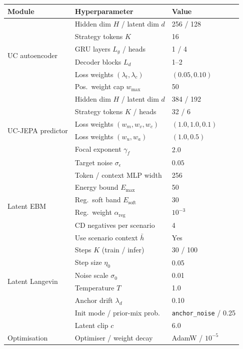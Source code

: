 \documentclass{article}
\begin{document}
\begin{table}[H]
\centering
\small
\begin{tabular}{lll}
\toprule
\textbf{Module} & \textbf{Hyperparameter} & \textbf{Value} \\
\midrule
\multirow{6}{*}{UC autoencoder}
  & Hidden dim $H$ / latent dim $d$ & 256 / 128 \\
  & Strategy tokens $K$ & 16 \\
  & GRU layers $L_g$ / heads & 1 / 4 \\
  & Decoder blocks $L_d$ & 1--2 \\
  & Loss weights $(\lambda_t, \lambda_c)$ & $(0.05, 0.10)$ \\
  & Pos.\ weight cap $w_{\max}$ & 50 \\
\midrule
\multirow{6}{*}{UC-JEPA predictor}
  & Hidden dim $H$ / latent dim $d$ & 384 / 192 \\
  & Strategy tokens $K$ / heads & 32 / 6 \\
  & Loss weights $(w_m, w_v, w_c)$ & $(1.0, 1.0, 0.1)$ \\
  & Loss weights $(w_u, w_a)$ & $(1.0, 0.5)$ \\
  & Focal exponent $\gamma_f$ & 2.0 \\
  & Target noise $\sigma_\epsilon$ & $0.05$ \\
\midrule
\multirow{6}{*}{Latent EBM}
  & Token / context MLP width & 256 \\
  & Energy bound $E_{\max}$ & 50 \\
  & Reg.\ soft band $E_{\mathrm{soft}}$ & 30 \\
  & Reg.\ weight $\alpha_{\mathrm{reg}}$ & $10^{-3}$ \\
  & CD negatives per scenario & 4 \\
  & Use scenario context $\bar h$ & Yes \\
\midrule
\multirow{6}{*}{Latent Langevin}
  & Steps $K$ (train / infer) & 30 / 100 \\
  & Step size $\eta_0$ & 0.05 \\
  & Noise scale $\sigma_0$ & 0.01 \\
  & Temperature $T$ & 1.0 \\
  & Anchor drift $\lambda_d$ & 0.10 \\
  & Init mode / prior-mix prob.\ & \texttt{anchor\_noise} / 0.25 \\
  & Latent clip $c$ & 6.0 \\
\midrule
\multirow{4}{*}{Optimisation}
  & Optimiser / weight decay & AdamW / $10^{-5}$ \\

\end{tabular}
\end{table}
\end{document}

